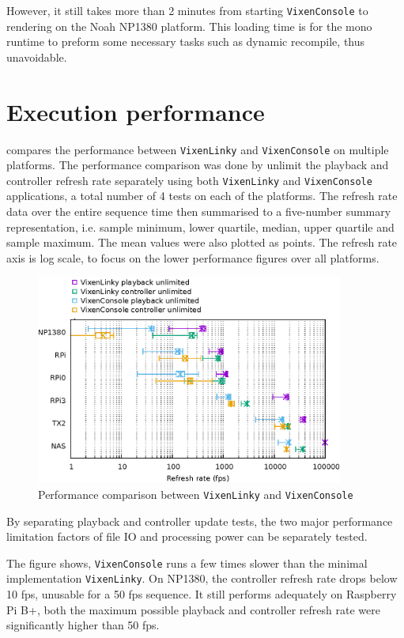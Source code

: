 However, it still takes more than 2 minutes from starting \texttt{VixenConsole} to rendering on the Noah NP1380 platform. This loading time is for the mono runtime to preform some necessary tasks such as dynamic recompile, thus unavoidable.

\section{Execution performance}

 compares the performance between \texttt{VixenLinky} and \texttt{VixenConsole} on multiple platforms. The performance comparison was done by unlimit the playback and controller refresh rate separately using both \texttt{VixenLinky} and \texttt{VixenConsole} applications, a total number of 4 tests on each of the platforms. The refresh rate data over the entire sequence time then summarised to a five-number summary representation, i.e. sample minimum, lower quartile, median, upper quartile and sample maximum. The mean values were also plotted as points. The refresh rate axis is log scale, to focus on the lower performance figures over all platforms.

\begin{figure}[t]
  \centering
  \includegraphics[width=0.9\textwidth]{Figs/raw-seq-p-c.eps}
  \caption{\footnotesize Performance comparison between \texttt{VixenLinky} and \texttt{VixenConsole}}
  \label{fig:raw-seq-p-c}
\end{figure}

By separating playback and controller update tests, the two major performance limitation factors of file IO and processing power can be separately tested.

The figure shows, \texttt{VixenConsole} runs a few times slower than the minimal implementation \texttt{VixenLinky}. On NP1380, the controller refresh rate drops below 10 fps, unusable for a 50 fps sequence. It still performs adequately on Raspberry Pi B+, both the maximum possible playback and controller refresh rate were significantly higher than 50 fps.

